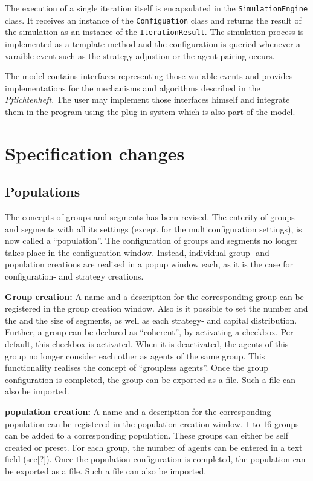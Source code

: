 \documentclass[parskip=full,11pt]{scrartcl}
\begin{document}
The execution of a single iteration itself is encapsulated in the \texttt{SimulationEngine} class. It receives an instance of the \texttt{Configuation} class and returns the result of the simulation as an instance of the \texttt{IterationResult}. The simulation process is implemented as a template method and the configuration is queried whenever a varaible event such as the strategy adjustion or the agent pairing occurs.

The model contains interfaces representing those variable events and provides implementations for the mechanisms and algorithms described in the \textit{Pflichtenheft}. The user may implement those interfaces himself and integrate them in the program using the plug-in system which is also part of the model.

\section{Specification changes}

\subsection{Populations}
The concepts of groups and segments has been revised. The enterity of groups and segments with all its settings (except for the multiconfiguration settings), is now called a \enquote{population}. The configuration of groups and segments no longer takes place in the configuration window. Instead, individual group- and population creations are realised in a popup window each, as it is the case for configuration- and strategy creations.

\textbf{Group creation:}
A name and a description for the corresponding group can be registered in the group creation window. Also is it possible to set the number and the and the size of segments, as well as each strategy- and capital distribution. Further, a group can be declared as \enquote{coherent}, by activating a checkbox. Per default, this checkbox is activated. When it is deactivated, the agents of this group no longer consider each other as agents of the same group. This functionality realises the concept of \enquote{groupless agents}. Once the group configuration is completed, the group can be exported as a file. Such a file can also be imported.

\textbf{population creation:}
A name and a description for the corresponding population can be registered in the population creation window. \(1\) to \(16\) groups can be added to a corresponding population. These groups can either be self created or preset. For each group, the number of agents can be entered in a text field (see\cref{?}). Once the population configuration is completed, the population can be exported as a file. Such a file can also be imported.
\end{document}
